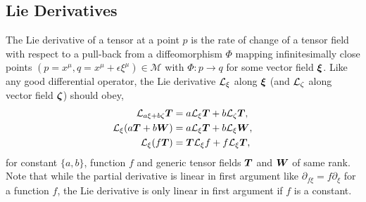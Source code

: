 \subsection{Lie Derivatives}\label{intro:sec:lie_deriv}

The Lie derivative of a tensor at a point $p$ is the rate of change of a tensor field with respect to a pull-back from a diffeomorphism $\Phi$ mapping infinitesimally close points $(p=x^\mu,q= x^\mu+\epsilon \xi^\mu) \in \mathcal{M}$ with $\Phi:p \rightarrow q $ for some vector field $\boldsymbol{\xi}$. Like any good differential operator, the Lie derivative $\mathcal{L}_\xi$ along $\boldsymbol{\xi}$ (and $\mathcal{L}_\zeta$ along vector field $\boldsymbol{\zeta}$) should obey,
\begin{align}
\mathcal{L}_{a \xi + b \zeta}\boldsymbol{T}  &= a \mathcal{L}_\xi\boldsymbol{T}  + b \mathcal{L}_\zeta\boldsymbol{T} ,\\
\mathcal{L}_\xi (a \boldsymbol{T} + b \boldsymbol{W}) & = a \mathcal{L}_\xi \boldsymbol{T} + b \mathcal{L}_\xi \boldsymbol{W} , \\
\mathcal{L}_\xi (f \boldsymbol{T} ) &= \boldsymbol{T} \mathcal{L}_\xi f + f \mathcal{L}_\xi \boldsymbol{T} \label{intro:eq:lie_liebnitz},
\end{align}
for constant $\{a,b\}$, function $f$ and generic tensor fields $\boldsymbol{T}$ and $\boldsymbol{W}$ of same rank. Note that while the partial derivative is linear in first argument like $\partial_{f \xi} = f \partial_\xi$ for a function $f$, the Lie derivative is only linear in first argument if $f$ is a constant.

